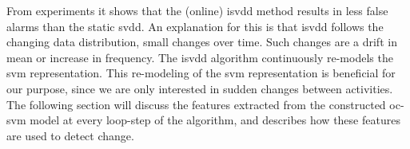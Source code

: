 From experiments it shows that the (online) \gls{isvdd} method results in less false alarms than the static \gls{svdd}.
An explanation for this is that \gls{isvdd} follows the changing data distribution, \ie small changes over time.
Such changes are a drift in mean or increase in frequency.
The \gls{isvdd} algorithm continuously re-models the \gls{svm} representation.
This re-modeling of the \gls{svm} representation is beneficial for our purpose, since we are only interested in sudden changes between activities.
The following section will discuss the features extracted from the constructed \gls{oc-svm} model at every loop-step of the algorithm, and  describes how these features are used to detect change.